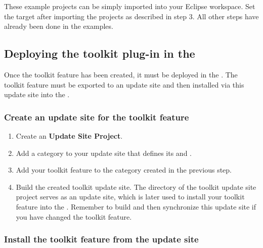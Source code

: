 These example projects can be simply imported into your Eclipse workspace. Set
the target after importing the projects as described in step 3. All other steps
have already been done in the examples.

\subsection{Deploying the toolkit plug-in in the \ite{}}

Once the toolkit feature has been created, it must be deployed in the \ite{}. The toolkit feature must be exported to an update
site and then installed via this update site into  the \ite{}.
 
\subsubsection{Create an update site for the toolkit feature}

\begin{enumerate}
\item Create an \textbf{Update Site Project}.
\item Add a category to your update site that defines its  and
      .
\item Add your toolkit feature to the category created in the previous step.
\item Build the created toolkit update site. The directory of the toolkit
      update site project serves as an update site, which is later used to
      install your toolkit feature into the \ite{}. Remember to build and then
      synchronize this update site if you have changed the toolkit feature.
\end{enumerate}

\subsubsection{Install the toolkit feature from the update site}

